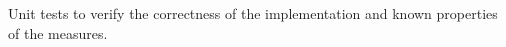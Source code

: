 \documentclass[preview]{standalone}
\begin{document}
Unit tests to verify the correctness of the implementation and known properties of the measures.\\
\end{document}
